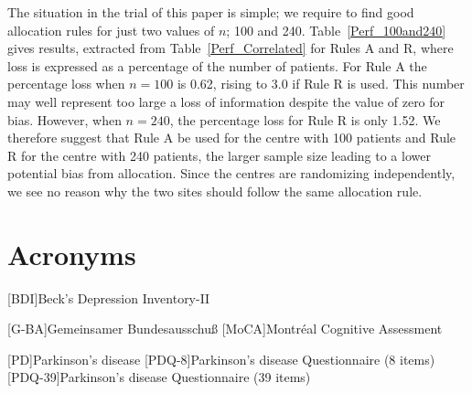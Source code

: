 \documentclass[number,12pt,review]{elsarticle}
\begin{document}
\begin{table}[ht]
\end{table}

The situation in the trial of this paper is simple; we require to find good allocation rules for just two values of $n$; 100 and 240. Table~\ref{Perf_100and240} gives results, extracted from Table~\ref{Perf_Correlated} for Rules A and R, where  loss is expressed as a percentage of the number of patients. For Rule A  the percentage loss when $n = 100$ is 0.62, rising to 3.0 if Rule R is used. This number may well represent too large a loss of information despite the value of zero for bias.
However, when $n = 240$, the percentage loss for Rule R is only 1.52. We therefore suggest that Rule A be used for the centre with 100 patients and Rule R for the centre with 240 patients, the larger sample size leading to a lower potential bias from allocation. Since the centres are randomizing
independently, we see no reason why the two sites should follow the same allocation rule.




\section{Acronyms}
\begin{acronym}
[BDI]{Beck's Depression Inventory-II}

[G-BA]{Gemeinsamer Bundesausschuß}
[MoCA]{Montréal Cognitive Assessment}

[PD]{Parkinson's disease}
[PDQ-8]{Parkinson's disease Questionnaire (8 items)}
[PDQ-39]{Parkinson's disease Questionnaire (39 items)}

\end{acronym}
\end{document}
